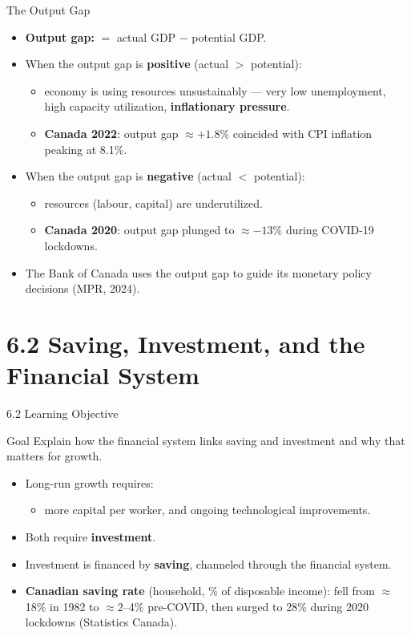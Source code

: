 \documentclass[aspectratio=169]{beamer}
\begin{document}
\begin{frame}{The Output Gap}
\transfade
\begin{itemize}
  \item \textbf{Output gap:} $= $ actual GDP $-$ potential GDP.
  \item When the output gap is \textbf{positive} (actual $>$ potential):
  \begin{itemize}
    \item economy is using resources \alert{unsustainably} --- very low unemployment, high capacity utilization, \textbf{inflationary pressure}.
    \item \textbf{Canada 2022}: output gap $\approx +1.8\%$ coincided with CPI inflation peaking at \alert{8.1\%}.
  \end{itemize}
  \item When the output gap is \textbf{negative} (actual $<$ potential):
  \begin{itemize}
    \item resources (labour, capital) are \alert{underutilized}.
    \item \textbf{Canada 2020}: output gap plunged to $\approx -13\%$ during COVID-19 lockdowns.
  \end{itemize}
  \item The Bank of Canada uses the output gap to guide its monetary policy decisions (MPR, 2024).
\end{itemize}
\end{frame}

\section{6.2 Saving, Investment, and the Financial System}

\begin{frame}{6.2 Learning Objective}
\transfade
\begin{block}{Goal}
Explain how the financial system links saving and investment and why that matters for growth.
\end{block}
\begin{itemize}
  \item Long-run growth requires:
  \begin{itemize}
    \item more capital per worker, and ongoing technological improvements.
  \end{itemize}
  \item Both require \textbf{investment}.
  \item Investment is financed by \textbf{saving}, channeled through the financial system.
  \item \textbf{Canadian saving rate} (household, \% of disposable income): fell from $\approx$18\% in 1982 to $\approx$2--4\% pre-COVID, then \alert{surged} to 28\% during 2020 lockdowns (Statistics Canada).
\end{itemize}
\end{frame}
\end{document}
